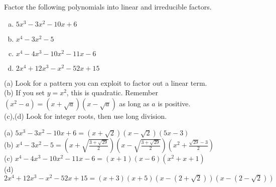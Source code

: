 \begin{question} Factor the following polynomials into linear and irreducible factors.
\begin{enumerate}[(a)]
\item $5x^3-3x^2-10x+6$
\item $x^4-3x^2-5$
\item $x^4-4x^3-10x^2-11x-6$
\item $2x^4+12x^3-x^2-52x+15$
\end{enumerate}
\end{question}
\begin{hint}
(a) Look for a pattern you can exploit to factor out a linear term.\\
(b) If you set $y=x^2$, this is quadratic. Remember $(x^2-a)= (x+\sqrt{a})(x-\sqrt{a})$ as long as $a$ is positive.\\
(c),(d) Look for integer roots, then use long division.
\end{hint}
\begin{answer}
(a) $5x^3-3x^2-10x+6=(x+\sqrt{2})(x-\sqrt{2})(5x-3)$\\[10pt]
(b)  $x^4-3x^2-5=\displaystyle\left(x+\sqrt{\frac{3+\sqrt{29}}{2}}\right)\left(x-\sqrt{\frac{3+\sqrt{29}}{2}}\right)\left(x^2+\frac{\sqrt{29}-3}{2}\right)$\\[10pt]
(c) $x^4-4x^3-10x^2-11x-6 = (x+1)(x-6)(x^2+x+1)$\\
(d) $2x^4+12x^3-x^2-52x+15= (x+3)(x+5)\left(x-(2+\sqrt2)\right)\left(x-(2-\sqrt2)\right)$
\end{answer}
